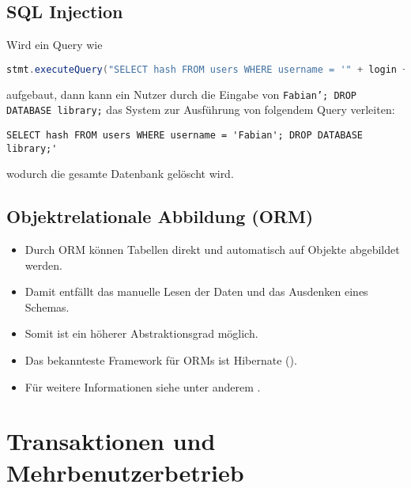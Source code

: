     \section{SQL Injection} %
		Wird ein Query wie
		\begin{lstlisting}[language = Java]
stmt.executeQuery("SELECT hash FROM users WHERE username = '" + login + "'");
		\end{lstlisting}
		aufgebaut, dann kann ein Nutzer durch die Eingabe von \texttt{Fabian'; DROP DATABASE library;} das System zur Ausführung von folgendem Query verleiten:
		\begin{lstlisting}
SELECT hash FROM users WHERE username = 'Fabian'; DROP DATABASE library;'
		\end{lstlisting}
		wodurch die gesamte Datenbank gelöscht wird.

    \section{Objektrelationale Abbildung (ORM)} %
        \begin{itemize}
        	\item Durch ORM können Tabellen direkt und automatisch auf Objekte abgebildet werden.
        	\item Damit entfällt das manuelle Lesen der Daten und das Ausdenken eines Schemas.
        	\item Somit ist ein höherer Abstraktionsgrad möglich.
        	\item Das bekannteste Framework für ORMs ist Hibernate ().
        	\item Für weitere Informationen siehe unter anderem .
        \end{itemize}

\chapter{Transaktionen und Mehrbenutzerbetrieb} %
    \label{c:transactions}

